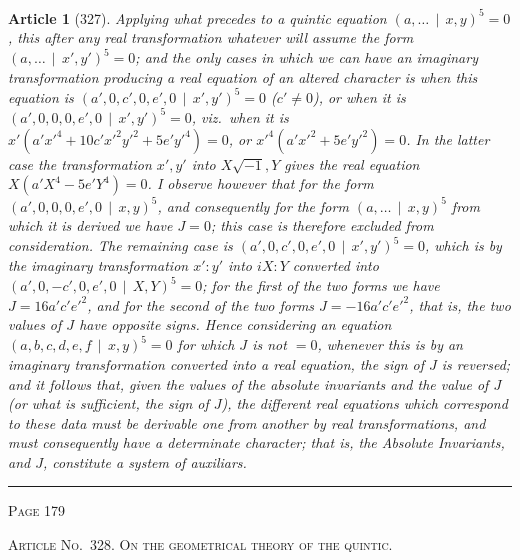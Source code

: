 \documentclass[11pt,a4paper]{article}
\theoremstyle{cayley}
\newtheorem{art}{Article}
\begin{document}
\begin{art}[327]
Applying what precedes to a quintic equation $(a, \ldots \,\mid\, x, y)^5 = 0$, this after any real transformation whatever will assume the form $(a, \ldots \,\mid\, x', y')^5 = 0$; and the only cases in which we can have an imaginary transformation producing a real equation of an altered character is when this equation is $(a', 0, c', 0, e', 0 \,\mid\, x', y')^5 = 0$ ($c' \neq 0$), or when it is $(a', 0, 0, 0, e', 0 \,\mid\, x', y')^5 = 0$, viz.\ when it is $x'(a'x'^4 + 10c'x'^2y'^2 + 5e'y'^4) = 0$, or $x'^4(a'x'^2 + 5e'y'^2) = 0$. In the latter case the transformation $x', y'$ into $X\sqrt{-1}, Y$ gives the real equation $X(a'X^4 - 5e'Y^4) = 0$. I observe however that for the form $(a', 0, 0, 0, e', 0 \,\mid\, x, y)^5$, and consequently for the form $(a, \ldots \,\mid\, x, y)^5$ from which it is derived we have $J=0$; this case is therefore excluded from consideration. The remaining case is $(a', 0, c', 0, e', 0 \,\mid\, x', y')^5 = 0$, which is by the imaginary transformation $x':y'$ into $iX:Y$ converted into $(a', 0, -c', 0, e', 0 \,\mid\, X, Y)^5 = 0$; for the first of the two forms we have $J = 16a'c'e'^2$, and for the second of the two forms $J = -16a'c'e'^2$, that is, the two values of $J$ have opposite signs. Hence considering an equation $(a, b, c, d, e, f \,\mid\, x, y)^5 = 0$ for which $J$ is not $=0$, whenever this is by an imaginary transformation converted into a real equation, the sign of $J$ is reversed; and it follows that, given the values of the absolute invariants and the value of $J$ (or what is sufficient, the sign of $J$), the different real equations which correspond to these data must be derivable one from another by real transformations, and must consequently have a determinate character; that is, the Absolute Invariants, and $J$, constitute a system of auxiliars.
\end{art}

\vspace{1em}
\noindent\rule{\textwidth}{0.4pt}
\begin{center}\textsc{Page 179}\end{center}
\newpage

\begin{center}
\textsc{Article No.\ 328. On the geometrical theory of the quintic.}
\end{center}
\end{document}

